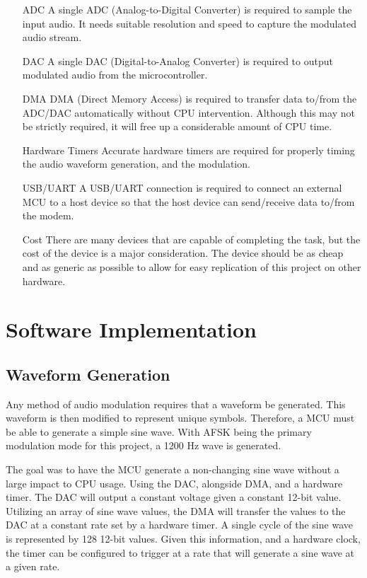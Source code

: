 \documentclass{journal}
\begin{document}
\begin{itemize}
  \item[ADC] A single ADC (Analog-to-Digital Converter) is required to sample the input audio. It needs suitable resolution and speed to capture the modulated audio stream.
  \item[DAC] A single DAC (Digital-to-Analog Converter) is required to output modulated audio from the microcontroller.
  \item[DMA] DMA (Direct Memory Access) is required to transfer data to/from the ADC/DAC automatically without CPU intervention. Although this may not be strictly required, it will free up a considerable amount of CPU time.
  \item[Hardware Timers] Accurate hardware timers are required for properly timing the audio waveform generation, and the modulation.
  \item[USB/UART] A USB/UART connection is required to connect an external MCU to a host device so that the host device can send/receive data to/from the modem.
  \item[Cost] There are many devices that are capable of completing the task, but the cost of the device is a major consideration. The device should be as cheap and as generic as possible to allow for easy replication of this project on other hardware.
\end{itemize}


\section{Software Implementation}
\subsection{Waveform Generation}
Any method of audio modulation requires that a waveform be generated. This waveform is then modified to represent unique symbols. Therefore, a MCU must be able to generate a simple sine wave. With AFSK being the primary modulation mode for this project, a 1200 Hz wave is generated.

The goal was to have the MCU generate a non-changing sine wave without a large impact to CPU usage. Using the DAC, alongside DMA, and a hardware timer. The DAC will output a constant voltage given a constant 12-bit value. Utilizing an array of sine wave values, the DMA will transfer the values to the DAC at a constant rate set by a hardware timer. A single cycle of the sine wave is represented by 128 12-bit values. Given this information, and a hardware clock, the timer can be configured to trigger at a rate that will generate a sine wave at a given rate.
\end{document}
